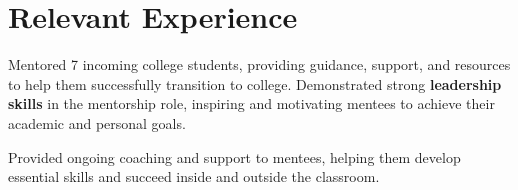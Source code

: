 
\section{Relevant Experience}
\begin{tightemize}
  \item Mentored 7 incoming college students, providing guidance, support, and resources to help them successfully transition to college. Demonstrated strong {\bf leadership skills} in the mentorship role, inspiring and motivating mentees to achieve their academic and personal goals.
  \item Provided ongoing coaching and support to mentees, helping them develop essential skills and succeed inside and outside the classroom.
\end{tightemize}
